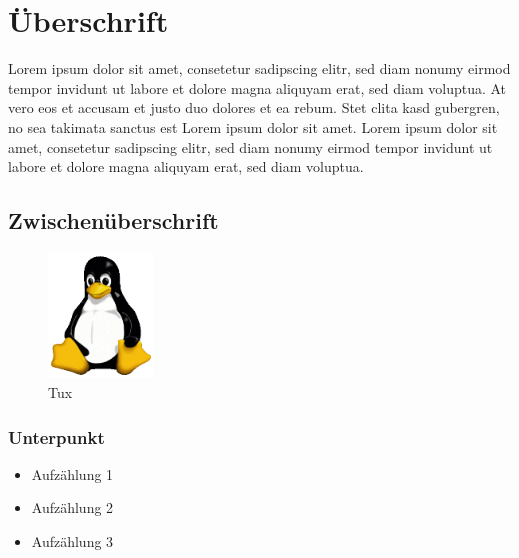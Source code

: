 \documentclass{scrartcl}
\begin{document}
\tableofcontents

\section{Überschrift}

Lorem ipsum dolor sit amet, consetetur sadipscing elitr, sed diam nonumy eirmod tempor invidunt ut labore et dolore magna aliquyam erat, sed diam voluptua. At vero eos et accusam et justo duo dolores et ea rebum. Stet clita kasd gubergren, no sea takimata sanctus est Lorem ipsum dolor sit amet. Lorem ipsum dolor sit amet, consetetur sadipscing elitr, sed diam nonumy eirmod tempor invidunt ut labore et dolore magna aliquyam erat, sed diam voluptua.

\subsection{Zwischenüberschrift}

\begin{figure}[h!]
\centering
\includegraphics[width=0.25\textwidth]{Tux}
\caption{Tux}
\label{threadsVsSync}
\end{figure}

\subsubsection{Unterpunkt}

\begin{itemize}
    \item Aufzählung 1
    \item Aufzählung 2
    \item Aufzählung 3
\end{itemize}
\end{document}
